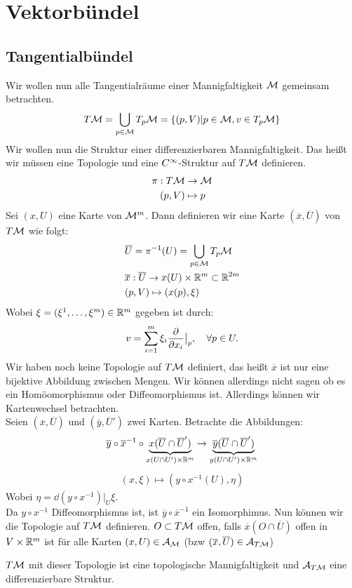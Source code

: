 \chapter{Vektorbündel}
\section{Tangentialbündel}
Wir wollen nun alle Tangentialräume einer Mannigfaltigkeit $\mathcal{M}$ gemeinsam betrachten.
\begin{align}
T\mathcal{M} = \bigcup_{p\in \mathcal{M}} T_{p}\mathcal{M} = \{ (p, V) \vert p \in \mathcal{M}, v \in T_{p}\mathcal{M} \} 
\end{align}
Wir wollen nun die Struktur einer differenzierbaren Mannigfaltigkeit. 
Das heißt wir müssen eine Topologie und eine $C^\infty$-Struktur auf $T\mathcal{M}$ definieren.
\begin{align}
\pi: T\mathcal{M} &\to \mathcal{M} \\
(p,V) &\mapsto p
\end{align}
Sei $(x, U)$ eine Karte von $\mathcal{M}^m$. 
Dann definieren wir eine Karte $(\overline{x}, \overline{U})$ von $T\mathcal{M}$ wie folgt:
\begin{align}
&\overline{U} = \pi^{-1}(U) = \bigcup_{p\in\mathcal{M}} T_{p}\mathcal{M} \\
&\overline{x}: \overline{U} \to x(U) \times \mathbb{R}^m \subset \mathbb{R}^{2m} \\
&(p, V) \mapsto (x(p), \xi)
\end{align}
Wobei $\xi = (\xi^1, \dots, \xi^m) \in \mathbb{R}^m$ gegeben ist durch:
\begin{align}
v = \sum_{i=1}^{m} \xi_i \pdv{x_i} \big\vert_p, \quad \forall p \in U.
\end{align}
Wir haben noch keine Topologie auf $T\mathcal{M}$ definiert, das heißt $\overline{x}$ ist nur eine bijektive Abbildung zwischen Mengen.
Wir können allerdings nicht sagen ob es ein Homöomorphismus oder Diffeomorphismus ist.
Allerdings können wir Kartenwechsel betrachten.\\
Seien $(\overline{x}, \overline{U})$ und $(\overline{y}, \overline{U}')$ zwei Karten. 
Betrachte die Abbildungen:
\begin{align}
\overline{y} \circ \overline{x}^{-1} \circ \underbrace{x (\overline{U} \cap \overline{U}')}_{x(U \cap U') \times \mathbb{R}^m} \to \underbrace{\overline{y}(\overline{U} \cap \overline{U}')}_{y(U \cap U') \times \mathbb{R}^m}
\end{align}
\begin{align}
(x,\xi) \mapsto (y\circ x^{-1}(U), \eta) 
\end{align}
Wobei $\eta = \dd (y \circ x^{-1})\big\vert_U \xi$.\\
Da $y\circ x^{-1}$ Diffeomorphismus ist, ist $\overline{y} \circ \overline{x}^{-1}$ ein Isomorphimus.
Nun können wir die Topologie auf $T\mathcal{M}$ definieren.
$O \subset T\mathcal{M}$ offen, falls $\overline{x}(O\cap \overline{U})$ offen in $V \times \mathbb{R}^m$ ist für alle Karten $(x, U) \in \mathcal{A}_{\mathcal{M}}$ (bzw $(\overline{x}, \overline{U}) \in \mathcal{A}_{T\mathcal{M}}$)
\begin{satz}
$T\mathcal{M}$ mit dieser Topologie ist eine topologische Mannigfaltigkeit und $\mathcal{A}_{T\mathcal{M}}$ eine differenzierbare Struktur.
\end{satz}
